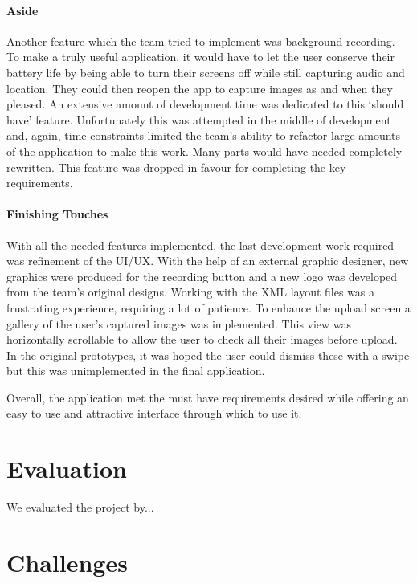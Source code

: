 \documentclass{l3proj}
\begin{document}
\subsubsection{Aside}
Another feature which the team tried to implement was background recording. To make a truly useful application, it would have to let the user conserve their battery life by being able to turn their screens off while still capturing audio and location. They could then reopen the app to capture images as and when they pleased. An extensive amount of development time was dedicated to this ‘should have’ feature. Unfortunately this was attempted in the middle of development and, again, time constraints limited the team’s ability to refactor large amounts of the application to make this work. Many parts would have needed completely rewritten. This feature was dropped in favour for completing the key requirements.

\subsubsection{Finishing Touches}
With all the needed features implemented, the last development work required was refinement of the UI/UX. With the help of an external graphic designer, new graphics were produced for the recording button and a new logo was developed from the team’s original designs. Working with the XML layout files was a frustrating experience, requiring a lot of patience. To enhance the upload screen a gallery of the user’s captured images was implemented. This view was horizontally scrollable to allow the user to check all their images before upload. In the original prototypes, it was hoped the user could dismiss these with a swipe but this was unimplemented in the final application.

Overall, the application met the must have requirements desired while offering an easy to use and attractive interface through which to use it.

\chapter{Evaluation}

We evaluated the project by...

\chapter{Challenges}
\label{Challenges}
\end{document}
